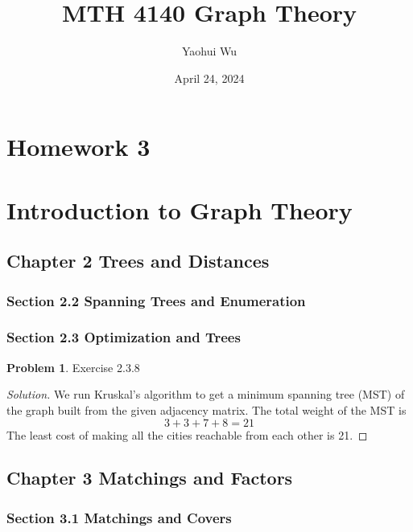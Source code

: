 \documentclass[12pt]{article}
\title{MTH 4140 Graph Theory}
\author{Yaohui Wu}
\date{April 24, 2024}
\theoremstyle{definition}
\newtheorem{problem}{Problem}
\newenvironment*{solution}{\begin{proof}[Solution]}{\end{proof}}
\begin{document}
\maketitle
\section*{Homework 3}
\section*{Introduction to Graph Theory}
\subsection*{Chapter 2 Trees and Distances}

\subsubsection*{Section 2.2 Spanning Trees and Enumeration}

\subsubsection*{Section 2.3 Optimization and Trees}
\begin{problem}
    Exercise 2.3.8
\end{problem}
\begin{solution}
    We run Kruskal's algorithm to get a minimum spanning tree (MST) of the
    graph built from the given adjacency matrix. The total weight of the MST
    is \[3+3+7+8=21\] The least cost of making all the cities reachable from
    each other is 21.
\end{solution}

\subsection*{Chapter 3 Matchings and Factors}
\subsubsection*{Section 3.1 Matchings and Covers}
\end{document}
